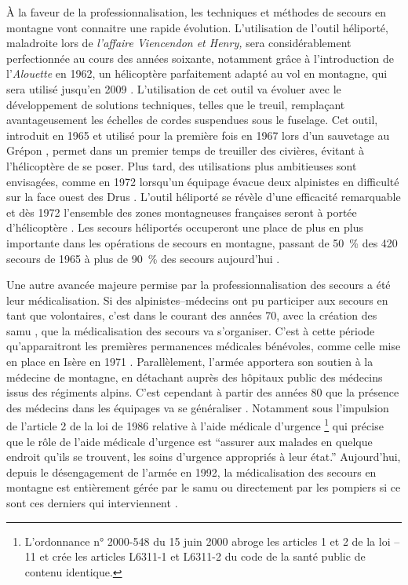 À la faveur de la professionnalisation, les techniques et méthodes de
secours en montagne vont connaitre une rapide évolution. L'utilisation
de l'outil héliporté, maladroite lors de \emph{l'affaire Viencendon et
  Henry,} sera considérablement perfectionnée au cours des années
soixante, notamment grâce à l'introduction de l'\emph{Alouette
  } en 1962, un hélicoptère parfaitement adapté au vol en
montagne, qui sera utilisé jusqu'en 2009 \autocite{Elie2006, Lafond,
  Lafond2011b}. L'utilisation de cet outil va évoluer avec le
développement de solutions techniques, telles que le treuil,
remplaçant avantageusement les échelles de cordes suspendues sous le
fuselage. Cet outil, introduit en 1965 et utilisé pour la première
fois en 1967 lors d'un sauvetage au Grépon \autocite{Lafond2011a},
permet dans un premier temps de treuiller des civières, évitant à
l'hélicoptère de se poser. Plus tard, des utilisations plus
ambitieuses sont envisagées, comme en 1972 lorsqu'un équipage évacue
deux alpinistes en difficulté sur la face ouest des Drus
\autocite{Ministere2013}. L'outil héliporté se révèle d'une efficacité
remarquable et dès 1972 l'ensemble des zones montagneuses françaises
seront à portée d'hélicoptère \autocite{CFDLD}. Les secours héliportés
occuperont une place de plus en plus importante dans les opérations de
secours en montagne, passant de 50~\% des 420 secours de 1965
\autocite{CFDLD} à plus de 90~\% des secours aujourd'hui
\autocite{Halle2007}.

Une autre avancée majeure permise par la professionnalisation des
secours a été leur médicalisation. Si des alpinistes--médecins ont pu
participer aux secours en tant que volontaires, c'est dans le courant
des années 70, avec la création des \ac{samu} \autocite{Halle2007},
que la médicalisation des secours va s'organiser. C'est à cette
période qu’apparaitront les premières permanences médicales bénévoles,
comme celle mise en place en Isère en 1971
\autocite{Rocourt2014}. Parallèlement, l'armée apportera son soutien à
la médecine de montagne, en détachant auprès des hôpitaux public des
médecins issus des régiments alpins. C'est cependant à partir des
années 80 que la présence des médecins dans les équipages va se
généraliser \autocite{CFDLD}. Notamment sous l'impulsion de l'article
2 de la loi de 1986 relative à l'aide médicale d'urgence
\footnote{L’ordonnance n° 2000-548 du 15 juin 2000 abroge les articles
  1 et 2 de la loi --11 et crée les articles L6311-1 et L6311-2
  du code de la santé public de contenu identique.}
\autocite{Rocourt2014} qui précise que le rôle de l'aide médicale
d'urgence est \enquote{assurer aux malades \textelp{} en
  quelque endroit qu'ils se trouvent, les soins d'urgence appropriés à
  leur état.}  Aujourd'hui, depuis le désengagement de l'armée en
1992, la médicalisation des secours en montagne est entièrement gérée
par le \ac{samu} ou directement par les pompiers si ce sont ces
derniers qui interviennent \autocite{Rocourt2014, Halle2007}.

